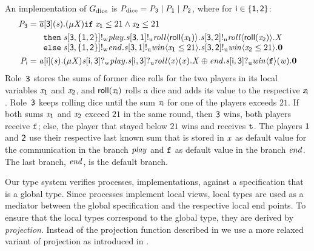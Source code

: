 An implementation of $ \GDiceW $ is $ \PDice = \PPar{\PDiceD}{\PPar{\PDiceR}{\PDiceQ}} $, where for $ \Role[i] \in \Set{ \Role[1], \Role[2] } $:
\begin{align*}
	\PDiceD ={}& \PReq{\Chan[a]}{\Role[3]}{\Chan}{\PRep{\ProcV}{\myif \; \Args_{\Role[1]} \leq 21 \wedge \Args_{\Role[2]} \leq 21}}\\
		& \begin{array}{l}
			\mythen \; \PSelW{\Chan}{\Role[3]}{\Set{\Role[1], \Role[2]}}{\Label[play]}{\PSendU{\Chan}{\Role[3]}{\Role[1]}{\Label[roll]}{\textsf{roll}(\Args_{\Role[1]})}{\PSendU{\Chan}{\Role[3]}{\Role[2]}{\Label[roll]}{\textsf{roll}(\Args_{\Role[2]})}{\ProcV}}}\\
			\myelse \; \PSelW{\Chan}{\Role[3]}{\Set{\Role[1], \Role[2]}}{\Label[end]}{\PSendU{\Chan}{\Role[3]}{\Role[1]}{\Label[win]}{\Args_{\Role[1]} \leq 21}{\PSendU{\Chan}{\Role[3]}{\Role[2]}{\Label[win]}{\Args_{\Role[2]} \leq 21}{\PEnd}}}
		\end{array}\\
	\PDiceP ={}& \PAcc{\Chan[a]}{\Role[i]}{\Chan}{\PRep{\ProcV}{\PBranW{\Chan}{\Role[i]}{\Role[3]}{\Label[play].\PGetU{\Chan}{\Role[i]}{\Role[3]}{\Label[roll]}{\Args}{\Args}{\ProcV} \oplus \Label[end].\PGetU{\Chan}{\Role[i]}{\Role[3]}{\Label[win]}{\false}{\Args[w]}{\PEnd}}}}
\end{align*}
Role~$ \Role[3] $ stores the sums of former dice rolls for the two players in its local variables $ \Args_{\Role[1]} $ and $ \Args_{\Role[2]} $, and $ \textsf{roll}(\Args_{\Role[i]}) $ rolls a dice and adds its value to the respective $ \Args_{\Role[i]} $.
Role~$ \Role[3] $ keeps rolling dice until the sum $ \Args_{\Role[i]} $ for one of the players exceeds $ 21 $.
If both sums $ \Args_{\Role[1]} $ and $ \Args_{\Role[2]} $ exceed $ 21 $ in the same round, then $ \Role[3] $ wins, \ie both players receive $ \false $; else, the player that stayed below $ 21 $ wins and receives $ \true $.
The players $ \Role[1] $ and $ \Role[2] $ use their respective last known sum that is stored in $ \Args $ as default value for the \unrel communication in the branch $ \Label[play] $ and $ \false $ as default value in the branch $ \Label[end] $.
The last branch, \ie $ \Label[end] $, is the default branch.

Our type system verifies processes, \ie implementations, against a specification that is a global type.
Since processes implement local views, local types are used as a mediator between the global specification and the respective local end points.
To ensure that the local types correspond to the global type, they are derived by \emph{projection}.
Instead of the projection function described in \cite{hondaYoshidaCarbone16} we use a more relaxed variant of projection as introduced in \cite{YoshidaDanielouBejleriHu10}.

